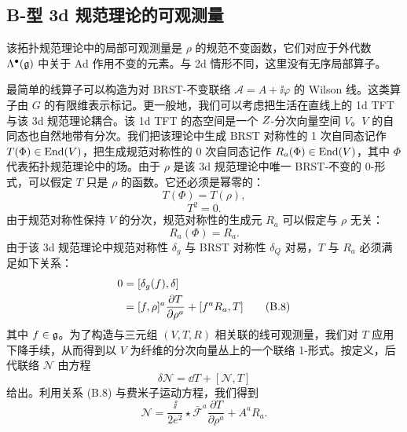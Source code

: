 \subsection*{B-型 3d 规范理论的可观测量}

该拓扑规范理论中的局部可观测量是 $\rho$ 的规范不变函数，它们对应于外代数 $\Lambda^\bullet(\mathfrak{g})$ 中关于 Ad 作用不变的元素。与 2d 情形不同，这里没有无序局部算子。

最简单的线算子可以构造为对 BRST-不变联络 $\mathcal{A}=A+\ii\varphi$ 的 Wilson 线。这类算子由 $G$ 的有限维表示标记。更一般地，我们可以考虑把生活在直线上的 1d TFT 与该 3d 规范理论耦合。该 1d TFT 的态空间是一个 $Z$-分次向量空间 $V$。$V$ 的自同态也自然地带有分次。我们把该理论中生成 BRST 对称性的 1 次自同态记作 $T(\Phi)\in\operatorname{End}(V)$，把生成规范对称性的 0 次自同态记作 $R_a(\Phi)\in\operatorname{End}(V)$，其中 $\Phi$ 代表拓扑规范理论中的场。由于 $\rho$ 是该 3d 规范理论中唯一 BRST-不变的 0-形式，可以假定 $T$ 只是 $\rho$ 的函数。它还必须是幂零的：
\begin{equation}
  T(\Phi)=T(\rho), \tag{B.5}
\end{equation}
\begin{equation}
  T^2=0. \tag{B.6}
\end{equation}
由于规范对称性保持 $V$ 的分次，规范对称性的生成元 $R_a$ 可以假定与 $\rho$ 无关：
\begin{equation}
  R_a(\Phi)=R_a. \tag{B.7}
\end{equation}
由于该 3d 规范理论中规范对称性 $\delta_g$ 与 BRST 对称性 $\delta_Q$ 对易，$T$ 与 $R_a$ 必须满足如下关系：
\begin{align}
  0 &= [\delta_g(f),\delta] \notag\\
    &= [f,\rho]^a\frac{\partial T}{\partial\rho^a}+[f^aR_a,T] \tag{B.8}
\end{align}
其中 $f\in\mathfrak{g}$。为了构造与三元组 $(V,T,R)$ 相关联的线可观测量，我们对 $T$ 应用下降手续，从而得到以 $V$ 为纤维的分次向量丛上的一个联络 1-形式。按定义，后代联络 $\mathcal{N}$ 由方程
\[
  \delta\mathcal{N}=\dd T+[\mathcal{N},T]
\]
给出。利用关系 (B.8) 与费米子运动方程，我们得到
\begin{equation}
  \mathcal{N}=\frac{\ii}{2e^2}\star\bar{\mathcal F}^a\frac{\partial T}{\partial\rho^a}+A^aR_a. \tag{B.9}
\end{equation}


